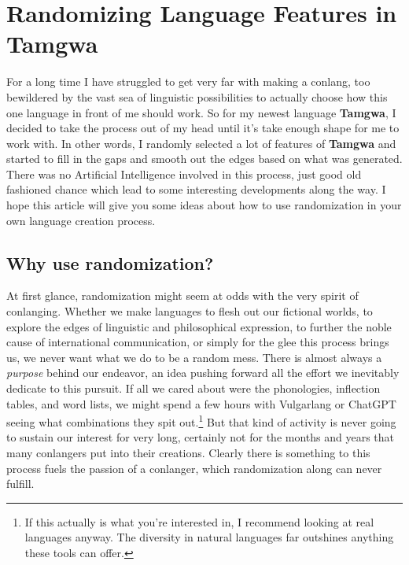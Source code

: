 \documentclass[a4paper,12pt,twoside,openright]{memoir}
\begin{document}


\chapter[Randomizing Language Features][Tamgwa]{Randomizing Language Features in Tamgwa}


\thispagestyle{fancy}
\BgUsetrue


    For a long time I have struggled to get very far with making a conlang, too bewildered by the vast sea of linguistic possibilities to actually choose how this one language in front of me should work.  So for my newest language \textbf{Tamgwa}, I decided to take the process out of my head until it's take enough shape for me to work with.  In other words, I randomly selected a lot of features of \textbf{Tamgwa} and started to fill in the gaps and smooth out the edges based on what was generated.  There was no Artificial Intelligence involved in this process, just good old fashioned chance which lead to some interesting developments along the way.  I hope this article will give you some ideas about how to use randomization in your own language creation process.

\section*{Why use randomization?} %

    At first glance, randomization might seem at odds with the very spirit of conlanging.  Whether we make languages to flesh out our fictional worlds, to explore the edges of linguistic and philosophical expression, to further the noble cause of international communication, or simply for the glee this process brings us, we never want what we do to be a random mess.  There is almost always a \textit{purpose} behind our endeavor, an idea pushing forward all the effort we inevitably dedicate to this pursuit.  If all we cared about were the phonologies, inflection tables, and word lists, we might spend a few hours with Vulgarlang or ChatGPT seeing what combinations they spit out.\footnote{If this actually is what you're interested in, I recommend looking at real languages anyway.  The diversity in natural languages far outshines anything these tools can offer.}  But that kind of activity is never going to sustain our interest for very long, certainly not for the months and years that many conlangers put into their creations.  Clearly there is something to this process fuels the passion of a conlanger, which randomization along can never fulfill.
\end{document}
